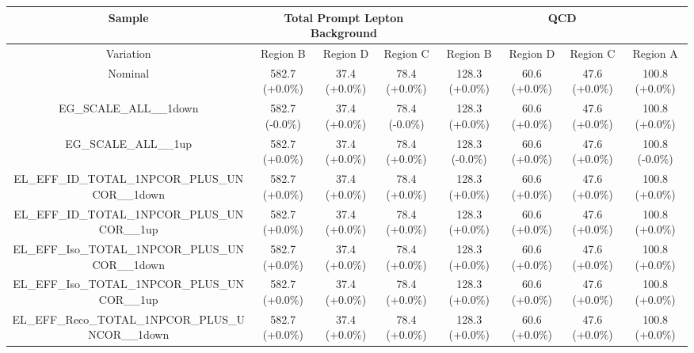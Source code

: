 %
%
\begin{table}[htbp!]
\begin{tiny}
\begin{center}
\begin{tabular}{c|c|c|c||c|c|c|c}
Sample                                                          &\multicolumn{3}{c||}{Total Prompt Lepton Background}      &\multicolumn{4}{c}{QCD}                                                  \\
\hline  
Variation                                                       & Region B       & Region D         & Region C           & Region B        & Region D         & Region C          & Region A         \\ 
\hline  
Nominal                                                         & 582.7     (+0.0\%) & 37.4      (+0.0\%) & 78.4      (+0.0\%) & 128.3     (+0.0\%) & 60.6      (+0.0\%) & 47.6      (+0.0\%) & 100.8     (+0.0\%) \\ 
\hline 
EG\_SCALE\_ALL\_\_1down                                      & 582.7     (-0.0\%) & 37.4      (+0.0\%) & 78.4      (-0.0\%) & 128.3     (+0.0\%) & 60.6      (+0.0\%) & 47.6      (+0.0\%) & 100.8     (+0.0\%) \\ 
EG\_SCALE\_ALL\_\_1up                                        & 582.7     (+0.0\%) & 37.4      (+0.0\%) & 78.4      (+0.0\%) & 128.3     (-0.0\%) & 60.6      (+0.0\%) & 47.6      (+0.0\%) & 100.8     (-0.0\%) \\ 
EL\_EFF\_ID\_TOTAL\_1NPCOR\_PLUS\_UNCOR\_\_1down             & 582.7     (+0.0\%) & 37.4      (+0.0\%) & 78.4      (+0.0\%) & 128.3     (+0.0\%) & 60.6      (+0.0\%) & 47.6      (+0.0\%) & 100.8     (+0.0\%) \\ 
EL\_EFF\_ID\_TOTAL\_1NPCOR\_PLUS\_UNCOR\_\_1up               & 582.7     (+0.0\%) & 37.4      (+0.0\%) & 78.4      (+0.0\%) & 128.3     (+0.0\%) & 60.6      (+0.0\%) & 47.6      (+0.0\%) & 100.8     (+0.0\%) \\ 
EL\_EFF\_Iso\_TOTAL\_1NPCOR\_PLUS\_UNCOR\_\_1down            & 582.7     (+0.0\%) & 37.4      (+0.0\%) & 78.4      (+0.0\%) & 128.3     (+0.0\%) & 60.6      (+0.0\%) & 47.6      (+0.0\%) & 100.8     (+0.0\%) \\ 
EL\_EFF\_Iso\_TOTAL\_1NPCOR\_PLUS\_UNCOR\_\_1up              & 582.7     (+0.0\%) & 37.4      (+0.0\%) & 78.4      (+0.0\%) & 128.3     (+0.0\%) & 60.6      (+0.0\%) & 47.6      (+0.0\%) & 100.8     (+0.0\%) \\ 
EL\_EFF\_Reco\_TOTAL\_1NPCOR\_PLUS\_UNCOR\_\_1down           & 582.7     (+0.0\%) & 37.4      (+0.0\%) & 78.4      (+0.0\%) & 128.3     (+0.0\%) & 60.6      (+0.0\%) & 47.6      (+0.0\%) & 100.8     (+0.0\%) \\ 

\end{tabular}
\end{center}
\end{tiny}
\end{table}
